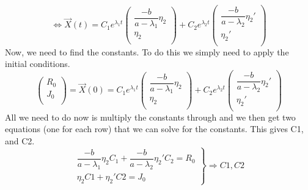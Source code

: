 \documentclass[a4paper]{article}
\begin{document}
    \begin{equation*}
        \Leftrightarrow
        \vec{X}(t) =
            {C_1}e^{\lambda_1 t}
                        \begin{pmatrix}
                            \dfrac{-b}{a-\lambda_1}\eta_2 \\
                            \eta_2 \\
                        \end{pmatrix}
            +
            {C_2}e^{\lambda_2 t}
                        \begin{pmatrix}
                            \dfrac{-b}{a-\lambda_2}\eta_2' \\
                            \eta_2' \\
                        \end{pmatrix}
    \end{equation*}
    Now, we need to find the constants.
    To do this we simply need to apply the initial conditions.
    \begin{equation*}
        \begin{pmatrix}
            R_0 \\
            J_0 \\
        \end{pmatrix}
        =
        \vec{X}(0)
        =
        {C_1}e^{\lambda_1 t}
            \begin{pmatrix}
                \dfrac{-b}{a-\lambda_1}\eta_2 \\
                \eta_2 \\
            \end{pmatrix}
        +
        {C_2}e^{\lambda_2 t}
            \begin{pmatrix}
                \dfrac{-b}{a-\lambda_2}\eta_2' \\
                \eta_2' \\
            \end{pmatrix}
    \end{equation*}
    All we need to do now is multiply the constants through and we then get two equations (one for each row) that we can solve for the constants. This gives C1, and C2.
    \begin{equation*}
        \left.
        \begin{array}{ll}
            \dfrac{-b}{a-\lambda_1}\eta_2 C_1 + \dfrac{-b}{a-\lambda_2}\eta_2' C_2 = R_0\\
            \eta_2 C1 + \eta_2' C2 = J_0
        \end{array}
        \right \} \Rightarrow C1, C2
    \end{equation*}
\end{document}
